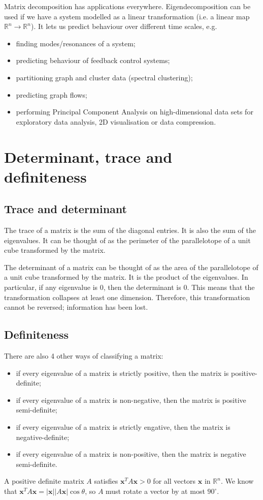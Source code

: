 \documentclass[a4paper, openany]{memoir}
\begin{document}
    Matrix decomposition has applications everywhere. Eigendecomposition can be used if we have a system modelled as a linear transformation (i.e. a linear map $\mathbb{R}^n \to \mathbb{R}^n$). It lets us predict behaviour over different time scales, e.g.
    \begin{itemize}
        \item finding modes/resonances of a system;
        \item predicting behaviour of feedback control systems;
        \item partitioning graph and cluster data (spectral clustering);
        \item predicting graph flows;
        \item performing Principal Component Analysis on high-dimensional data sets for exploratory data analysis, 2D visualisation or data compression.
    \end{itemize}
    \newpage

    \section{Determinant, trace and definiteness}
    \subsection{Trace and determinant}
    The trace of a matrix is the sum of the diagonal entries. It is also the sum of the eigenvalues. It can be thought of as the perimeter of the parallelotope of a unit cube transformed by the matrix.

    The determinant of a matrix can be thought of as the area of the parallelotope of a unit cube transformed by the matrix. It is the product of the eigenvalues. In particular, if any eigenvalue is 0, then the determinant is 0. This means that the transformation collapses at least one dimension. Therefore, this transformation cannot be reversed; information has been lost.

    \subsection{Definiteness}
    There are also 4 other ways of classifying a matrix:
    \begin{itemize}
        \item if every eigenvalue of a matrix is strictly positive, then the matrix is positive-definite;
        \item if every eigenvalue of a matrix is non-negative, then the matrix is positive semi-definite;
        \item if every eigenvalue of a matrix is strictly engative, then the matrix is negative-definite;
        \item if every eigenvalue of a matrix is non-positive, then the matrix is negative semi-definite.
    \end{itemize}
    A positive definite matrix $A$ satisfies $\mathbf{x}^T A \mathbf{x} > 0$ for all vectors $\mathbf{x}$ in $\mathbb{R}^n$. We know that $\mathbf{x}^T A \mathbf{x} = |\mathbf{x}| |A \mathbf{x}| \cos \theta$, so $A$ must rotate a vector by at most $90^{\circ}$.
\end{document}

